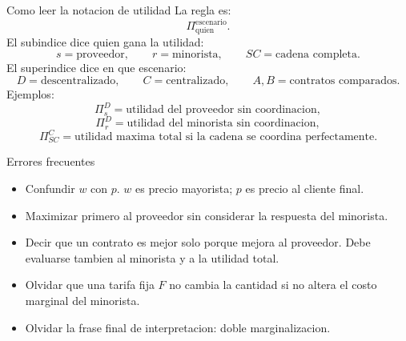 \begin{materia}{Como leer la notacion de utilidad}
La regla es:
\[
\Pi_{\text{quien}}^{\text{escenario}}.
\]
El subindice dice quien gana la utilidad:
\[
s=\text{proveedor},
\qquad
r=\text{minorista},
\qquad
SC=\text{cadena completa}.
\]
El superindice dice en que escenario:
\[
D=\text{descentralizado},
\qquad
C=\text{centralizado},
\qquad
A,B=\text{contratos comparados}.
\]
Ejemplos:
\[
\Pi_s^D=\text{utilidad del proveedor sin coordinacion},
\]
\[
\Pi_r^D=\text{utilidad del minorista sin coordinacion},
\]
\[
\Pi_{SC}^C=\text{utilidad maxima total si la cadena se coordina perfectamente}.
\]
\end{materia}

\begin{trampa}{Errores frecuentes}
\begin{itemize}[itemsep=2pt]
    \item Confundir \(w\) con \(p\). \(w\) es precio mayorista; \(p\) es precio al cliente final.
    \item Maximizar primero al proveedor sin considerar la respuesta del minorista.
    \item Decir que un contrato es mejor solo porque mejora al proveedor. Debe evaluarse tambien al minorista y a la utilidad total.
    \item Olvidar que una tarifa fija \(F\) no cambia la cantidad si no altera el costo marginal del minorista.
    \item Olvidar la frase final de interpretacion: doble marginalizacion.
\end{itemize}
\end{trampa}
